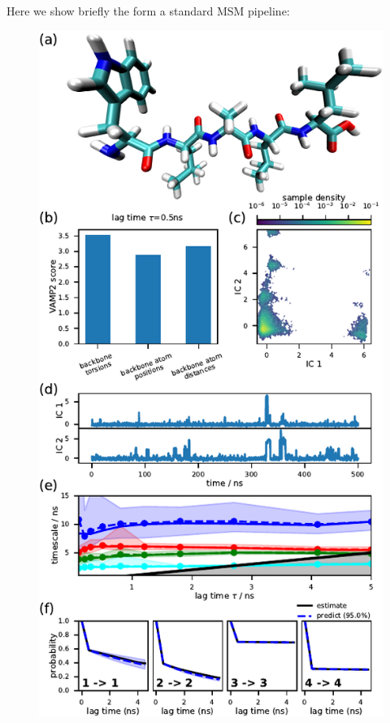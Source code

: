 \documentclass[9pt,tutorial,lineno,onehalfspacing]{livecoms}
\begin{document}
Here we show briefly the form a standard MSM pipeline:

\begin{figure}
\includegraphics{figure_1}

\end{figure}
\end{document}
